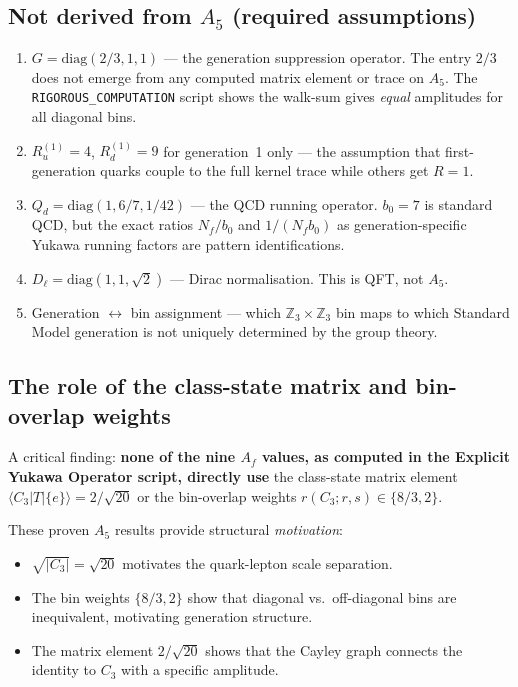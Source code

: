 \documentclass[11pt]{article}
\theoremstyle{remark}
\begin{document}
\subsection{Not derived from $A_5$ (required assumptions)}

\begin{enumerate}[nosep]
  \item $G = \mathrm{diag}(2/3, 1, 1)$ --- the generation suppression operator.
    The entry $2/3$ does not emerge from any computed matrix element or trace on $A_5$.
    The \texttt{RIGOROUS\_COMPUTATION} script shows the walk-sum gives \emph{equal} amplitudes for all diagonal bins.
  \item $R_u^{(1)} = 4$, $R_d^{(1)} = 9$ for generation~1 only --- the assumption that first-generation quarks couple to the full kernel trace while others get $R = 1$.
  \item $Q_d = \mathrm{diag}(1, 6/7, 1/42)$ --- the QCD running operator.
    $b_0 = 7$ is standard QCD, but the exact ratios $N_f/b_0$ and $1/(N_f b_0)$ as generation-specific Yukawa running factors are pattern identifications.
  \item $D_\ell = \mathrm{diag}(1, 1, \sqrt{2})$ --- Dirac normalisation.
    This is QFT, not $A_5$.
  \item Generation $\leftrightarrow$ bin assignment --- which $\mathbb{Z}_3 \times \mathbb{Z}_3$ bin maps to which Standard Model generation is not uniquely determined by the group theory.
\end{enumerate}

\subsection{The role of the class-state matrix and bin-overlap weights}

A critical finding: \textbf{none of the nine $A_f$ values, as computed in the Explicit Yukawa Operator script, directly use} the class-state matrix element $\langle C_3 | T | \{e\}\rangle = 2/\sqrt{20}$ or the bin-overlap weights $r(C_3; r,s) \in \{8/3, 2\}$.

These proven $A_5$ results provide structural \emph{motivation}:
\begin{itemize}[nosep]
  \item $\sqrt{|C_3|} = \sqrt{20}$ motivates the quark-lepton scale separation.
  \item The bin weights $\{8/3, 2\}$ show that diagonal vs.\ off-diagonal bins are inequivalent, motivating generation structure.
  \item The matrix element $2/\sqrt{20}$ shows that the Cayley graph connects the identity to $C_3$ with a specific amplitude.
\end{itemize}
\end{document}
